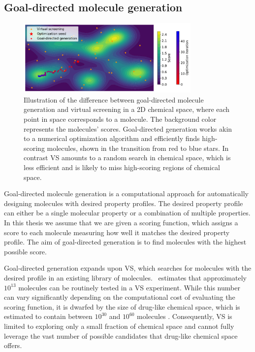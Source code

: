\subsection{Goal-directed molecule generation}
\begin{figure}
      \centering
      \includegraphics[width=0.8\textwidth]{./figures/goal_directed_generation_vs.pdf}
      \caption{Illustration of the difference between goal-directed molecule generation and virtual
            screening in a 2D chemical space, where each point in space corresponds to a molecule. The
            background color represents the molecules' scores. Goal-directed generation works
            akin to a numerical optimization algorithm and efficiently finds high-scoring molecules,
            shown in the transition from red to blue stars. In contrast VS amounts to a random search in chemical space, which is less efficient
            and is likely to miss high-scoring regions of chemical space. \label{fig:goal-directed-generation}}
\end{figure}

Goal-directed molecule generation \citep{schneiderNovoMolecularDesign2013} is a computational
approach for automatically designing molecules with desired property profiles. The desired
property profile can either be a single molecular property or a combination of multiple properties.
In this thesis we assume that we are given a scoring function, which assigns a score to each molecule
measuring how well it matches the desired property profile. The aim of goal-directed generation is
to find molecules with the highest possible score.

Goal-directed generation expands upon \ac{VS}, which searches for molecules with the desired profile
in an existing library of molecules.\ \citet{waltersVirtualChemicalLibraries2019} estimates that approximately
$10^{13}$ molecules can be routinely tested in a \ac{VS} experiment. While this number can vary
significantly depending on the computational cost of evaluating the scoring function, it is dwarfed
by the size of drug-like chemical space, which is estimated to contain between $10^{30}$ and
$10^{60}$ molecules \citep{waltersVirtualChemicalLibraries2019,ruddigkeitEnumeration166Billion2012}.
Consequently, \ac{VS} is limited to exploring only a small fraction of chemical space and cannot
fully leverage the vast number of possible candidates that drug-like chemical space offers.

